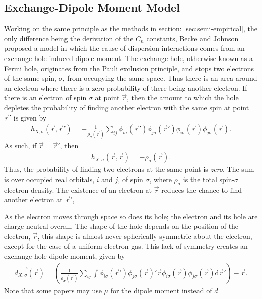 \documentclass[10pt,a4paper,twocolumn,twoside]{extarticle}
\renewcommand{\d}{\text{d}}
\begin{document}
	\subsection{Exchange-Dipole Moment Model}
	\label{sec:XDM}
	Working on the same principle as the methods in section: \ref{sec:semi-empirical}, the only difference being the derivation of the $C_n$ constants, Becke and Johnson proposed a model\cite{XDM-Original} in which the cause of dispersion interactions comes from an exchange-hole induced dipole moment.\cite{XDM-dipole,XDM-HF,XDM-HigherOrder} The exchange hole, otherwise known as a Fermi hole, originates from the Pauli exclusion principle, and stops two electrons of the same spin, $\sigma$, from occupying the same space. Thus there is an area around an electron where there is a zero probability of there being another electron. If there is an electron of spin $\sigma$ at point $\vec{r}$, then the amount to which the hole depletes the probability of finding another electron with the same spin at point $\vec{r}'$ is given by 
	\begin{align}
		h_{X,\sigma}(\vec{r},\vec{r}') = -\frac{1}{\rho_\sigma(\vec{r})} \sum_{ij} 
										\phi_{i\sigma}(\vec{r}') \phi_{j\sigma}(\vec{r}')
										\phi_{i\sigma}(\vec{r}) \phi_{j\sigma}(\vec{r}).
	\end{align}
	As such, if $\vec{r} = \vec{r}'$, then 
	\begin{align}
		h_{X,\sigma}(\vec{r}, \vec{r}) = -\rho_\sigma(\vec{r}).
	\end{align}
	Thus, the probability of finding two electrons at the same point is \emph{zero}.
	The sum is over occupied real orbitals, $i$ and $j$, of spin $\sigma$, where $\rho_\sigma$ is the total spin-$\sigma$ electron density. The existence of an electron at $\vec{r}$ reduces the chance to find another electron at $\vec{r}'$, 

	As the electron moves through space so does its hole; the electron and its hole are charge neutral overall. 
	The shape of the hole depends on the position of the electron, $\vec{r}$, this shape is almost never spherically symmetric about the electron, except for the case of a uniform electron gas. This lack of symmetry creates an exchange hole dipole moment, given by 
	{\footnotesize
	\begin{align}
		\label{eq:exchange-dipole}
		\vec{d_{X,\sigma}}(\vec{r}) = \left( \frac{1}{\rho_\sigma(\vec{r})} \sum_{ij}\int
									 \phi_{i\sigma}(\vec{r}') \phi_{j\sigma}(\vec{r})' 
									 \vec{r}\phi_{i\sigma}(\vec{r}) \phi_{j\sigma}(\vec{r}) 
									 \d\vec{r}'\right) - \vec{r}.
	\end{align}}
	Note that some papers may use $\mu$ for the dipole moment instead of $d$
\end{document}
